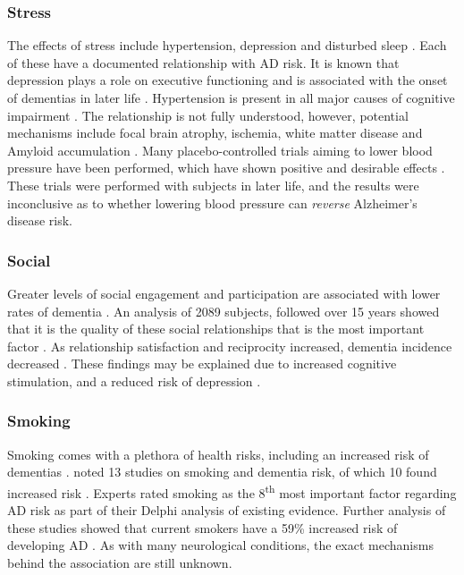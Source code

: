 \subsubsection{Stress} \label{target-stress}
The effects of stress include hypertension, depression and disturbed sleep \cite{Schneiderman2005}. Each of these have a documented relationship with AD risk. It is known that depression plays a role on executive functioning and is associated with the onset of dementias in later life \cite{Dotson2010,Royall2012,Boyle2010}. Hypertension is present in all major causes of cognitive impairment \cite{Iadecola2014}. The relationship is not fully understood, however, potential mechanisms include focal brain atrophy, ischemia, white matter disease and Amyloid accumulation \cite{Iadecola2014}. Many placebo-controlled trials aiming to lower blood pressure have been performed, which have shown positive and desirable effects \cite{Staessen2011}. These trials were performed with subjects in later life, and the results were inconclusive as to whether lowering blood pressure can \textit{reverse} Alzheimer's disease risk.

\subsubsection{Social}
Greater levels of social engagement and participation are associated with lower rates of dementia \cite{Saczynski2006, Fratiglioni2000}. An analysis of 2089 subjects, followed over 15 years showed that it is the quality of these social relationships that is the most important factor \cite{Amieva2010}. As relationship satisfaction and reciprocity increased, dementia incidence decreased \cite{Amieva2010}. These findings may be explained due to increased cognitive stimulation, and a reduced risk of depression \cite{Saczynski2010}.

\subsubsection{Smoking}
Smoking comes with a plethora of health risks, including an increased risk of dementias \cite{cdc_smoking}. \citeauthor{Deckers2015} noted 13 studies on smoking and dementia risk, of which 10 found increased risk \cite{Deckers2015}. Experts rated smoking as the 8\textsuperscript{th} most important factor regarding AD risk as part of their Delphi analysis of existing evidence. Further analysis of these studies showed that current smokers have a 59\% increased risk of developing AD \cite{Peters2008}. As with many neurological conditions, the exact mechanisms behind the association are still unknown.

